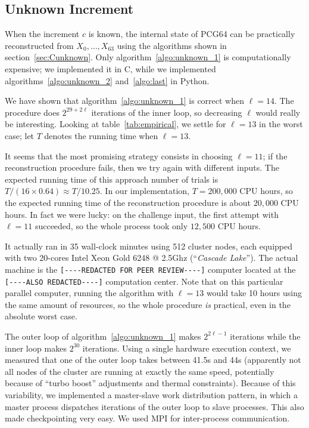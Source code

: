 \documentclass[submission,svgnames,journal=tosc]{iacrtrans}
\begin{document}
\subsection{Unknown Increment}

When the increment $c$ is known, the internal state of \textsf{PCG64} can be
practically reconstructed from $X_0, \dots, X_{63}$ using the algorithms shown
in section~\ref{sec:Cunknown}. Only algorithm~\ref{algo:unknown_1} is
computationally expensive; we implemented it in \textsf{C}, while we implemented
algorithms~\ref{algo:unknown_2} and~\ref{algo:last} in \textsf{Python}.

We have shown that algorithm~\ref{algo:unknown_1} is correct when $\ell=14$. The
procedure does $2^{29 + 2\ell}$ iterations of the inner loop, so decreasing
$\ell$ would really be interesting. Looking at table~\ref{tab:empirical}, we
settle for $\ell=13$ in the worst case; let $T$ denotes the running time when
$\ell=13$.

It seems that the most promising strategy consists in choosing $\ell=11$; if the
reconstruction procedure fails, then we try again with different inputs. The
expected running time of this approach number of trials is
$T/(16 \times 0.64) \approx T / 10.25$. In our implementation, $T = 200,000$ CPU
hours, so the expected running time of the reconstruction procedure is about
$20,000$ CPU hours. In fact we were lucky: on the challenge input, the first
attempt with $\ell=11$ succeeded, so the whole process took only $12,500$ CPU
hours.

It actually ran in 35 wall-clock minutes using 512 cluster nodes, each equipped
with two 20-cores \textsf{Intel Xeon Gold 6248 @ 2.5Ghz} (``\emph{Cascade
  Lake}''). The actual machine is the \verb|[----REDACTED FOR PEER REVIEW----]|
computer located at the \verb|[----ALSO REDACTED----]| computation center. Note
that on this particular parallel computer, running the algorithm with $\ell=13$
would take 10 hours using the same amount of resources, so the whole procedure
\emph{is} practical, even in the absolute worst case.

The outer loop of algorithm~\ref{algo:unknown_1} makes $2^{2\ell - 1}$
iterations while the inner loop makes $2^{30}$ iterations. Using a single
hardware execution context, we measured that one of the outer loop takes between
41.5s and 44s (apparently not all nodes of the cluster are running at exactly
the same speed, potentially because of ``turbo boost'' adjustments and thermal
constraints). Because of this variability, we implemented a master-slave work
distribution pattern, in which a master process dispatches iterations of the
outer loop to slave processes. This also made checkpointing very easy. We used
\textsf{MPI} for inter-process communication.
\end{document}
